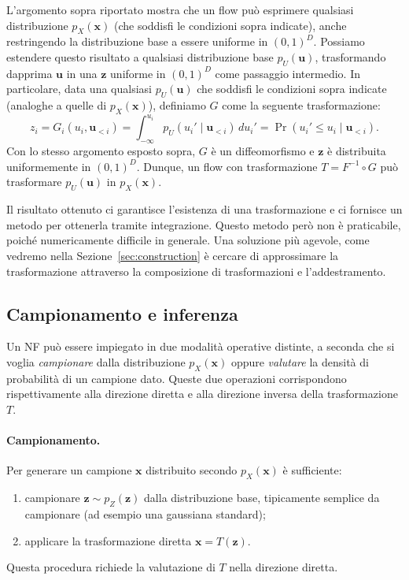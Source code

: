 L'argomento sopra riportato mostra che un flow può esprimere qualsiasi distribuzione $p_X(\mathbf{x})$ (che soddisfi le condizioni sopra indicate), anche restringendo la distribuzione base a essere uniforme in $(0,1)^D$. Possiamo estendere questo risultato a qualsiasi distribuzione base $p_U(\mathbf{u})$, trasformando dapprima $\mathbf{u}$ in una $\mathbf{z}$ uniforme in $(0,1)^D$ come passaggio intermedio. In particolare, data una qualsiasi $p_U(\mathbf{u})$ che soddisfi le condizioni sopra indicate (analoghe a quelle di $p_X(\mathbf{x})$), definiamo $G$ come la seguente trasformazione:
\begin{equation}
    z_i = G_i(u_i, \mathbf{u}_{<i}) = \int_{-\infty}^{u_i} p_U(u_i' \mid \mathbf{u}_{<i}) \, du_i' = \Pr(u_i' \le u_i \mid \mathbf{u}_{<i}).
\end{equation}
Con lo stesso argomento esposto sopra, $G$ è un diffeomorfismo e $\mathbf{z}$ è distribuita uniformemente in $(0,1)^D$. Dunque, un flow con trasformazione $T = F^{-1} \circ G$ può trasformare $p_U(\mathbf{u})$ in $p_X(\mathbf{x})$.

Il risultato ottenuto ci garantisce l'esistenza di una trasformazione e ci fornisce un metodo per ottenerla tramite integrazione. Questo metodo però non è praticabile, poiché numericamente difficile in generale. Una soluzione più agevole, come vedremo nella Sezione~\ref{sec:construction} è cercare di approssimare la trasformazione attraverso la composizione di trasformazioni e l'addestramento.

\subsection{Campionamento e inferenza}

Un NF può essere impiegato in due modalità operative distinte, a seconda che si voglia \emph{campionare} dalla distribuzione $p_X(\mathbf{x})$ oppure \emph{valutare} la densità di probabilità di un campione dato. Queste due operazioni corrispondono rispettivamente alla direzione diretta e alla direzione inversa della trasformazione $T$.

\paragraph{Campionamento.} Per generare un campione $\mathbf{x}$ distribuito secondo $p_X(\mathbf{x})$ è sufficiente:
\begin{enumerate}
    \item campionare $\mathbf{z} \sim p_Z(\mathbf{z})$ dalla distribuzione base, tipicamente semplice da campionare (ad esempio una gaussiana standard);
    \item applicare la trasformazione diretta $\mathbf{x} = T(\mathbf{z})$.
\end{enumerate}
Questa procedura richiede la valutazione di $T$ nella direzione diretta.

